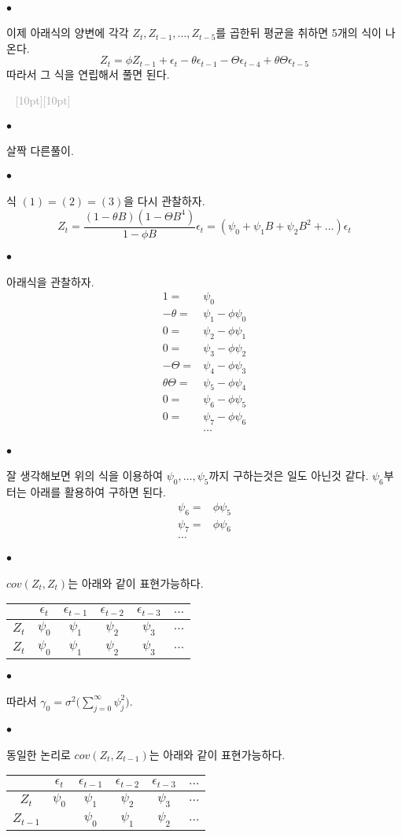 \documentclass[12pt,oneside,english]{book}
\newcommand{\dash}{\vspace{2em}\noindent \textcolor{darkgray}{\hrulefill~ \raisebox{-2.5pt}[10pt][10pt]{\leafright \decofourleft \decothreeleft  \aldineright \decotwo \floweroneleft \decoone   \floweroneright \decotwo \aldineleft\decothreeright \decofourright \leafleft} ~  \hrulefill \\ \vspace{2em}}}
\def\ck{\paragraph{\Large$\bullet$}\Large}
\begin{document}
\ck 이제 아래식의 양변에 각각 $Z_t,Z_{t-1},\dots,Z_{t-5}$를 곱한뒤 평균을 취하면 5개의 식이 나온다. 
\[
Z_t=\phi Z_{t-1}+\epsilon_t-\theta \epsilon_{t-1} -\Theta \epsilon_{t-4} +\theta\Theta\epsilon_{t-5}
\]
따라서 그 식을 연립해서 풀면 된다. 

\dash 

\ck 살짝 다른풀이. 

\ck 식 $(1)=(2)=(3)$을 다시 관찰하자. 
\[
Z_t=\frac{(1-\theta B)(1-\Theta B^4)}{1-\phi B}\epsilon_t=(\psi_0+\psi_1 B+\psi_2 B^2 +\dots )\epsilon_{t}
\]

\ck 아래식을 관찰하자. 
\begin{align*}
1=&\psi_0 \\ 
-\theta=&\psi_1-\phi\psi_0 \\ 
0=&\psi_2-\phi\psi_1 \\
0=&\psi_3-\phi\psi_2 \\
-\Theta=&\psi_4-\phi\psi_3 \\
\theta\Theta=&\psi_5-\phi\psi_4 \\
0 =& \psi_6-\phi \psi_5 \\
0 =& \psi_7-\phi \psi_6 \\
& \dots 
\end{align*}

\ck 잘 생각해보면 위의 식을 이용하여 $\psi_0,\dots,\psi_5$까지 구하는것은 일도 아닌것 같다. $\psi_6$부터는 아래를 활용하여 구하면 된다. 
\begin{align*}
\psi_6=&\phi\psi_5 \\
\psi_7=&\phi\psi_6 \\ 
\dots 
\end{align*}

\ck $cov(Z_t,Z_t)$는 아래와 같이 표현가능하다. 
\begin{table}[h]
\center\Large
\begin{tabular}{|c|c|c|c|c|c|}
\hline
      & $\epsilon_t$      & $\epsilon_{t-1}$ & $\epsilon_{t-2}$ & $\epsilon_{t-3}$ & $\dots$ \\ \hline
$Z_t$ & $\psi_0$		  & $\psi_1$         & $\psi_2$         & $\psi_3$         & $\dots$ \\ \hline
$Z_t$ & $\psi_0$          & $\psi_1$         & $\psi_2$         & $\psi_3$         & $\dots$ \\ \hline
\end{tabular}
\end{table}

\ck 따라서 $\gamma_0=\sigma^2\big(\sum_{j=0}^{\infty}\psi_j^2\big).$

\ck 동일한 논리로 $cov(Z_t,Z_{t-1})$는 아래와 같이 표현가능하다. 
\begin{table}[h]
\center\Large
\begin{tabular}{|c|c|c|c|c|c|}
\hline
      & $\epsilon_t$      & $\epsilon_{t-1}$ & $\epsilon_{t-2}$ & $\epsilon_{t-3}$ & $\dots$ \\ \hline
$Z_t$ & $\psi_0$ 		  & $\psi_1$         & $\psi_2$         & $\psi_3$         & $\dots$ \\ \hline
$Z_{t-1}$ & 			  & $\psi_0$         & $\psi_1$         & $\psi_2$         & $\dots$ \\ \hline
\end{tabular}
\end{table}
\end{document}
